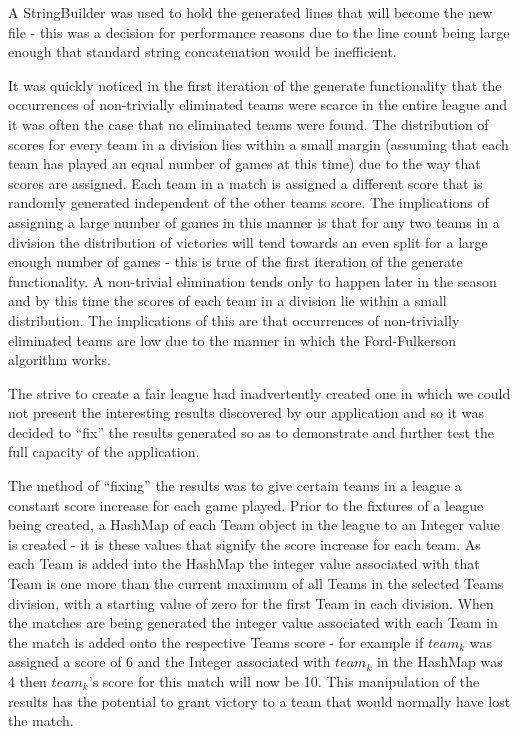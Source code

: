 A StringBuilder was used to hold the generated lines that will become
the new file - this was a decision for performance reasons due to the
line count being large enough that standard string concatenation would
be inefficient.

It was quickly noticed in the first iteration of the generate
functionality that the occurrences of non-trivially eliminated teams
were scarce in the entire league and it was often the case that no
eliminated teams were found. The distribution of scores for every team
in a division lies within a small margin (assuming that each team has
played an equal number of games at this time) due to the way that
scores are assigned. Each team in a match is assigned a different
score that is randomly generated independent of the other teams
score. The implications of assigning a large number of games in this
manner is that for any two teams in a division the distribution of
victories will tend towards an even split for a large enough number of
games - this is true of the first iteration of the generate
functionality. A non-trivial elimination tends only to happen later in
the season and by this time the scores of each team in a division lie
within a small distribution. The implications of this are that
occurrences of non-trivially eliminated teams are low due to the manner
in which the Ford-Fulkerson algorithm works.


The strive to create a fair league had inadvertently created one in
which we could not present the interesting results discovered by our
application and so it was decided to ``fix'' the results generated so as
to demonstrate and further test the full capacity of the application.

The method of ``fixing'' the results was to give certain teams in a
league a constant score increase for each game played.
Prior to the fixtures of a league being created, a HashMap of each
Team object in the league to an Integer value is created - it is
these values that signify the score increase for each team. As each
Team is added into the HashMap the integer value associated with that
Team is one more than the current maximum of all Teams in the selected
Teams division, with a starting value of zero for the first Team in
each division. When the matches are being generated the integer value
associated with each Team in the match is added onto the respective
Teams score - for example if $team_k$ was assigned a score of 6 and the
Integer associated with $team_k$ in the HashMap was 4 then $team_k$'s
score for this match will now be 10. This manipulation of the results
has the potential to grant victory to a team that would normally have
lost the match.

